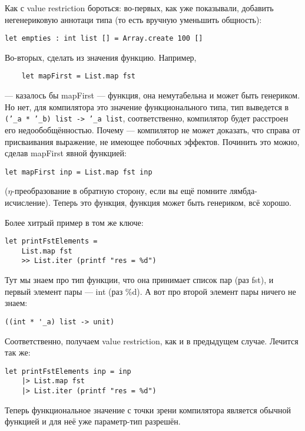 \documentclass[a5paper]{article}
\begin{document}
Как с value restriction бороться: во-первых, как уже показывали, добавить негенериковую аннотаци типа (то есть вручную уменьшить общность):

\begin{verbatim}
let empties : int list [] = Array.create 100 []
\end{verbatim}

Во-вторых, сделать из значения функцию. Например, 

\begin{verbatim}
    let mapFirst = List.map fst
\end{verbatim}

--- казалось бы mapFirst --- функция, она немутабельна и может быть генериком. Но нет, для компилятора это значение функционального типа, тип выведется в \texttt{('_a * '_b) list -> '_a list}, соответственно, компилятор будет расстроен его недообобщённостью. Почему --- компилятор не может доказать, что справа от присваивания выражение, не имеющее побочных эффектов. Починить это можно, сделав mapFirst явной функцией:

\begin{verbatim}
let mapFirst inp = List.map fst inp
\end{verbatim}

($\eta$-преобразование в обратную сторону, если вы ещё помните лямбда-исчисление). Теперь это функция, функция может быть генериком, всё хорошо.

Более хитрый пример в том же ключе:

\begin{verbatim}
let printFstElements = 
    List.map fst
    >> List.iter (printf "res = %d")
\end{verbatim}

Тут мы знаем про тип функции, что она принимает список пар (раз fst), и первый элемент пары --- int (раз \%d). А вот про второй элемент пары ничего не знаем:

\begin{verbatim}
((int * '_a) list -> unit)    
\end{verbatim}

Соответственно, получаем value restriction, как и в предыдущем случае. Лечится так же:

\begin{verbatim}
let printFstElements inp = inp
    |> List.map fst
    |> List.iter (printf "res = %d")
\end{verbatim}

Теперь функциональное значение с точки зрени компилятора является обычной функцией и для неё уже параметр-тип разрешён.
\end{document}
